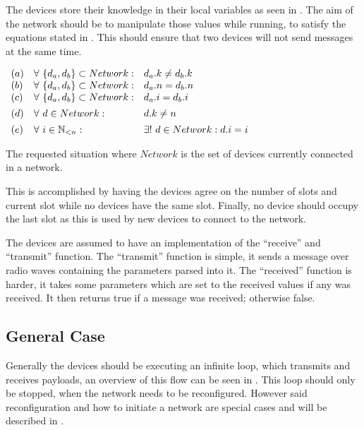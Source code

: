 The devices store their knowledge in their local variables as seen in . 
The aim of the network should be to manipulate those values while running, to satisfy the equations stated in . 
This should ensure that two devices will not send messages at the same time.

\begin{table}[H]
	\centering
	$\begin{array}{l l l}
		(a)&\forall\ \{d_a, d_b\} \subset Network: & d_a.k \neq d_b.k \\
		(b)&\forall\ \{d_a, d_b\} \subset Network: & d_a.n = d_b.n \\
		(c)&\forall\ \{d_a, d_b\} \subset Network: & d_a.i = d_b.i \\[1ex]
		(d)&\forall\ d \in Network: & d.k \neq n \\[1ex]
		(e)&\forall\ i \in \mathbb{N}_{<n}: & \exists!\ d \in Network: d.i = i 
	\end{array}$
	\caption{The requested situation where $Network$ is the set of devices currently connected in a network.}
    \label{tab:invariants}
\end{table}

This is accomplished by having the devices agree on the number of slots and current slot while no devices have the same slot. 
Finally, no device should occupy the last slot as this is used by new devices to connect to the network.

The devices are assumed to have an implementation of the \enquote{receive} and \enquote{transmit} function.
The \enquote{transmit} function is simple, it sends a message over radio waves containing the parameters parsed into it.
The \enquote{received} function is harder, it takes some parameters which are set to the received values if any was received. 
It then returns true if a message was received; otherwise false.
                    
\subsection{General Case} %
\label{sub:general_case}
Generally the devices should be executing an infinite loop, which transmits and receives payloads, an overview of this flow can be seen in .
This loop should only be stopped, when the network needs to be reconfigured.
However said reconfiguration and how to initiate a network are special cases and will be described in .



